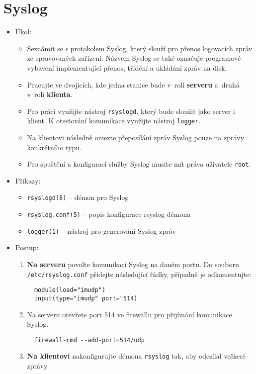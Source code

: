 \section{Syslog}
\begin{itemize}
  \item Úkol: 
    \begin{itemize}
      \item Seznámit se s protokolem Syslog, který slouží pro přenos
        logovacích zpráv ze spravovaných zařízení. Názvem Syslog se také označuje programové vybavení implementující přenos, třídění a ukládání zpráv na disk.
      \item Pracujte ve dvojicích, kde jedna stanice bude v~roli {\bf serveru} a~druhá v~roli {\bf klienta}.
      \item Pro práci využijte nástroj {\tt rsyslogd}, který bude sloužit jako server i klient.
        K otestování komunikace využijte nástroj {\tt logger}.
      \item Na klientovi následně omezte přeposílání zpráv Syslog pouze na zprávy konkrétního typu.
      \item Pro spuštění a konfiguraci služby Syslog musíte mít práva uživatele {\tt root}.
    \end{itemize}
  \item Příkazy:
    \begin{itemize}
      \item {\tt rsyslogd(8)} -- démon pro Syslog
      \item {\tt rsyslog.conf(5)} -- popis konfigurace rsyslog démona
      \item {\tt logger(1)} -- nástroj pro generování Syslog zpráv
    \end{itemize}
  \item Postup:
    \begin{enumerate}
      \item {\bf Na serveru} povolte komunikaci Syslog na daném portu. Do souboru {\tt /etc/rsyslog.conf} přidejte následující řádky, případně je odkomentujte:
\begin{verbatim}
  module(load="imudp")
  input(type="imudp" port="514)
\end{verbatim}
      \item Na serveru otevřete port 514 ve firewallu pro přijímání komunikace Syslog.
\begin{verbatim}
  firewall-cmd --add-port=514/udp
\end{verbatim}
      \item {\bf Na klientovi} nakonfigurujte démona {\tt rsyslog} tak, aby odesílal veškeré zprávy

\end{enumerate}
\end{itemize}
